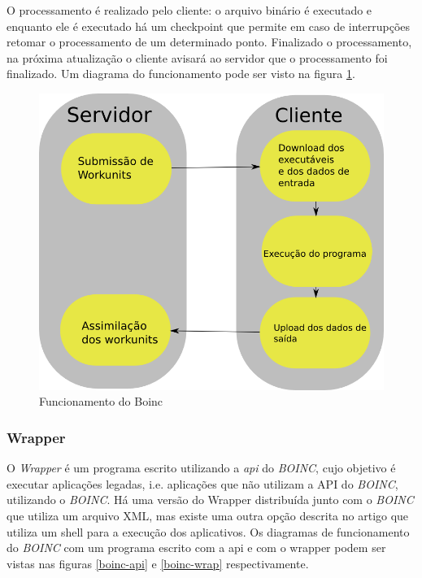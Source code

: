 O processamento é realizado pelo cliente: o arquivo binário é executado e enquanto ele é executado há um checkpoint
que permite em caso de interrupções retomar o processamento de um determinado ponto. Finalizado o processamento, 
na próxima atualização o cliente avisará ao servidor que o processamento foi finalizado. Um diagrama do funcionamento pode
ser visto na figura \ref{funcionamento-boinc}. 


\begin{figure}[!h]
  \centering
  \includegraphics[scale=0.5]{boinc-schema.png}
  \caption{Funcionamento do Boinc}
  \label{funcionamento-boinc}
\end{figure}

\newpage

\subsubsection{Wrapper}


O \emph{Wrapper} é um programa escrito utilizando a \emph{api} do \emph{BOINC}, cujo objetivo é executar aplicações legadas, 
i.e. aplicações que não utilizam a API do \emph{BOINC}, utilizando o \textit{BOINC}. Há uma versão do Wrapper distribuída junto com o 
\textit{BOINC} que utiliza um arquivo XML, mas existe uma outra opção descrita no artigo \cite{hungaro} que utiliza um shell para a 
execução dos aplicativos. Os diagramas de funcionamento do 
\emph{BOINC} com um programa escrito com a api e com o wrapper podem ser vistas nas figuras \ref{boinc-api} e \ref{boinc-wrap} 
respectivamente.



